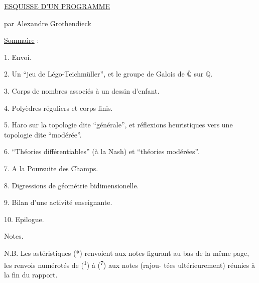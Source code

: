 
\uline{ESQUISSE D'UN PROGRAMME}

par Alexandre Grothendieck

\uline{Sommaire} :

1. Envoi.

2. Un ``jeu de Légo-Teichmüller'', et le groupe de Galois de $\overline{\mathbb{Q}}$ sur $\mathbb{Q}$.

3. Corps de nombres associés à un dessin d'enfant.

4. Polyèdres réguliers et corps finis.

5. Haro sur la topologie dite ``générale'', et réflexions heuristiques
vers une topologie dite ``modérée''.

6. ``Théories différentiables'' (à la Nash) et ``théories modérées''.

7. A la Poursuite des Champs.

8. Digressions de géométrie bidimensionelle.

9. Bilan d'une activité enseignante.

10. Epilogue.

Notes.

N.B. Les astéristiques (*) renvoient aux notes figurant au bas de
la même page, les renvois numérotés de (\textsuperscript{1}) à (\textsuperscript{7}) aux notes (rajou-%
tées ultérieurement) réunies à la fin du rapport.

